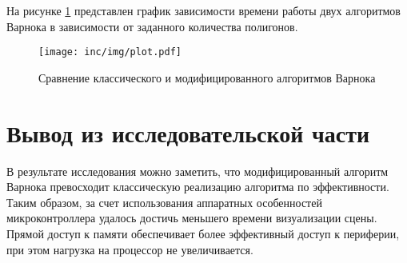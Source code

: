 \begin{table}[H]
    \caption{\label{tbl:time}Замеры времени сравнения алгоритмов Варнока}
\end{table}

На рисунке \ref{img:plot} представлен график зависимости времени работы двух алгоритмов Варнока в зависимости от заданного количества полигонов.

\begin{figure}[H]
	\centering
	\texttt{[image: inc/img/plot.pdf]}
	\caption{Сравнение классического и модифицированного алгоритмов Варнока}
	\label{img:plot}
\end{figure}

\section{Вывод из исследовательской части}
В результате исследования можно заметить, что модифицированный алгоритм Варнока превосходит классическую реализацию алгоритма по эффективности. Таким образом, за счет использования аппаратных особенностей микроконтроллера удалось достичь меньшего времени визуализации сцены. Прямой доступ к памяти обеспечивает более эффективный доступ к периферии, при этом нагрузка на процессор не увеличивается.
